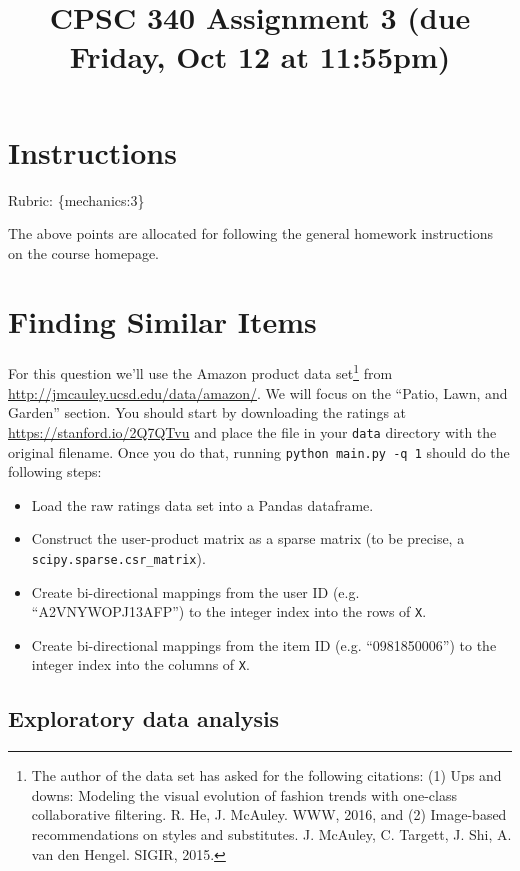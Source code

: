\documentclass{article}
\def\rubric#1{\gre{Rubric: \{#1\}}}{}
\def\gre#1{{\color{gre}#1}}
\begin{document}
\title{CPSC 340 Assignment 3 (due Friday, Oct 12 at 11:55pm)}
\date{}
\maketitle

\vspace{-7em}

\section*{Instructions}
\rubric{mechanics:3}

The above points are allocated for following the general homework instructions on the course homepage.


\section{Finding Similar Items}

For this question we'll use the Amazon product data set\footnote{The author of the data set has asked for the following citations: (1) Ups and downs: Modeling the visual evolution of fashion trends with one-class collaborative filtering. R. He, J. McAuley. WWW, 2016, and (2) Image-based recommendations on styles and substitutes. J. McAuley, C. Targett, J. Shi, A. van den Hengel. SIGIR, 2015.} from \url{http://jmcauley.ucsd.edu/data/amazon/}. We will focus on the ``Patio, Lawn, and Garden'' section. You should start by downloading the ratings at \\
\url{https://stanford.io/2Q7QTvu} and place the file in your \texttt{data} directory with the original filename. Once you do that, running \texttt{python main.py -q 1} should do the following steps:

\begin{itemize}
\item Load the raw ratings data set into a Pandas dataframe.
\item Construct the user-product matrix as a sparse matrix (to be precise, a \verb|scipy.sparse.csr_matrix|).
\item Create bi-directional mappings from the user ID (e.g. ``A2VNYWOPJ13AFP'') to the integer index into the rows of \texttt{X}.
\item Create bi-directional mappings from the item ID (e.g. ``0981850006'') to the integer index into the columns of \texttt{X}.
\end{itemize}

\subsection{Exploratory data analysis}
\end{document}
